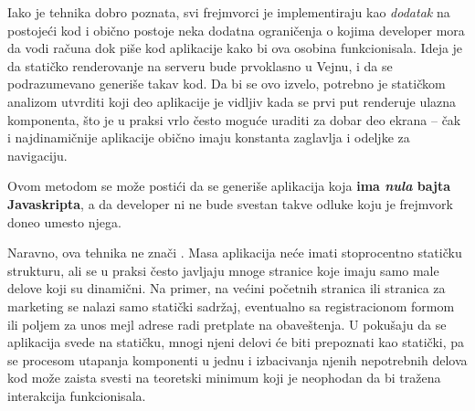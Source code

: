 Iako je tehnika dobro poznata, svi frejmvorci je implementiraju kao \emph{dodatak} na postojeći kod i obično postoje neka dodatna ograničenja o kojima developer mora da vodi računa dok piše kod aplikacije kako bi ova osobina funkcionisala.
Ideja je da statičko renderovanje na serveru bude prvoklasno u Vejnu, i da se podrazumevano generiše takav kod.
Da bi se ovo izvelo, potrebno je statičkom analizom utvrditi koji deo aplikacije je vidljiv kada se prvi put renderuje ulazna komponenta, što je u praksi vrlo često moguće uraditi za dobar deo ekrana -- čak i najdinamičnije aplikacije obično imaju konstanta zaglavlja i odeljke za navigaciju.

Ovom metodom se može postići da se generiše aplikacija koja \textbf{ima \emph{nula} bajta Javaskripta}, a da developer ni ne bude svestan takve odluke koju je frejmvork doneo umesto njega.

Naravno, ova tehnika ne znači .
Masa aplikacija neće imati stoprocentno statičku strukturu, ali se u praksi često javljaju mnoge stranice koje imaju samo male delove koji su dinamični.
Na primer, na većini početnih stranica ili stranica za marketing se nalazi samo statički sadržaj, eventualno sa registracionom formom ili poljem za unos mejl adrese radi pretplate na obaveštenja.
U pokušaju da se aplikacija svede na statičku, mnogi njeni delovi će biti prepoznati kao statički, pa se procesom utapanja komponenti u jednu i izbacivanja njenih nepotrebnih delova kod može zaista svesti na teoretski minimum koji je neophodan da bi tražena interakcija funkcionisala.
